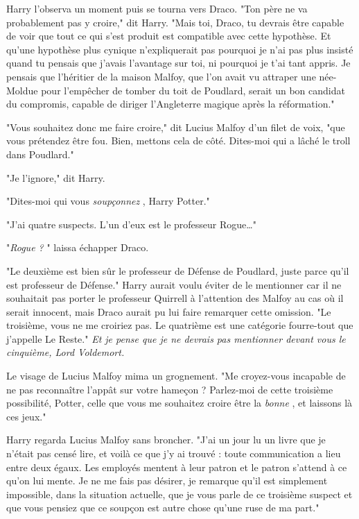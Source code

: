 Harry l'observa un moment puis se tourna vers Draco. "Ton père ne va probablement pas y croire," dit Harry. "Mais toi, Draco, tu devrais être capable de voir que tout ce qui s'est produit est compatible avec cette hypothèse. Et qu'une hypothèse plus cynique n'expliquerait pas pourquoi je n'ai pas plus insisté quand tu pensais que j'avais l'avantage sur toi, ni pourquoi je t'ai tant appris. Je pensais que l'héritier de la maison Malfoy, que l'on avait vu attraper une née-Moldue pour l'empêcher de tomber du toit de Poudlard, serait un bon candidat du compromis, capable de diriger l'Angleterre magique après la réformation."

"Vous souhaitez donc me faire croire," dit Lucius Malfoy d'un filet de voix, "que vous prétendez être fou. Bien, mettons cela de côté. Dites-moi qui a lâché le troll dans Poudlard."

"Je l'ignore," dit Harry.

"Dites-moi qui vous \emph{soupçonnez} , Harry Potter."

"J'ai quatre suspects. L'un d'eux est le professeur Rogue…"

"\emph{Rogue ?} " laissa échapper Draco.

"Le deuxième est bien sûr le professeur de Défense de Poudlard, juste parce qu'il est professeur de Défense." Harry aurait voulu éviter de le mentionner car il ne souhaitait pas porter le professeur Quirrell à l'attention des Malfoy au cas où il serait innocent, mais Draco aurait pu lui faire remarquer cette omission. "Le troisième, vous ne me croiriez pas. Le quatrième est une catégorie fourre-tout que j'appelle Le Reste." \emph{Et je pense que je ne devrais pas mentionner devant vous le cinquième, Lord Voldemort.} 

Le visage de Lucius Malfoy mima un grognement. "Me croyez-vous incapable de ne pas reconnaître l'appât sur votre hameçon ? Parlez-moi de cette troisième possibilité, Potter, celle que vous me souhaitez croire être la \emph{bonne} , et laissons là ces jeux."

Harry regarda Lucius Malfoy sans broncher. "J'ai un jour lu un livre que je n'était pas censé lire, et voilà ce que j'y ai trouvé : toute communication a lieu entre deux égaux. Les employés mentent à leur patron et le patron s'attend à ce qu'on lui mente. Je ne me fais pas désirer, je remarque qu'il est simplement impossible, dans la situation actuelle, que je vous parle de ce troisième suspect et que vous pensiez que ce soupçon est autre chose qu'une ruse de ma part."

